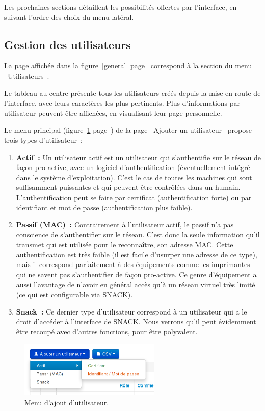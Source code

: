 Les prochaines sections détaillent les possibilités offertes par l'interface, en suivant l'ordre des choix du menu latéral.

\subsection{Gestion des utilisateurs}

La page affichée dans la figure~\ref{general} page~\pageref{general} correspond à la section du menu \og~Utilisateurs~\fg.

Le tableau au centre présente tous les utilisateurs créés depuis la mise en route de l'interface, avec leurs caractères les plus pertinents. Plus d'informations par utilisateur peuvent être affichées, en visualisant leur page personnelle.

Le menu principal (figure~\ref{menuusers} page~\pageref{menuusers}) de la page \og~Ajouter un utilisateur~\fg{} propose trois types d'utilisateur~:

\begin{enumerate}
\item \textbf{Actif~:} Un utilisateur actif est un utilisateur qui s'authentifie sur le réseau de façon pro-active, avec un logiciel d'authentification (éventuellement intégré dans le système d'exploitation). C'est le cas de toutes les machines qui sont suffisamment puissantes et qui peuvent être contrôlées dans un humain. L'authentification peut se faire par certificat (authentification forte) ou par identifiant et mot de passe (authentification plus faible).
\item \textbf{Passif (MAC)~:} Contrairement à l'utilisateur actif, le passif n'a pas conscience de s'authentifier sur le réseau. C'est donc la seule information qu'il transmet qui est utilisée pour le reconnaître, son adresse MAC. Cette authentification est très faible (il est facile d'usurper une adresse de ce type), mais il correspond parfaitement à des équipements comme les imprimantes qui ne savent pas s'authentifier de façon pro-active. Ce genre d'équipement a aussi l'avantage de n'avoir en général accès qu'à un réseau virtuel très limité (ce qui est configurable via SNACK).
\item \textbf{Snack~:} Ce dernier type d'utilisateur correspond à un utilisateur qui a le droit d'accéder à l'interface de SNACK. Nous verrons qu'il peut évidemment être recoupé avec d'autres fonctions, pour être polyvalent.
\end{enumerate}

\begin{figure}[!h]
	\begin{center}
	    \includegraphics[width=0.6\textwidth]{img/menuusers.png}
	\end{center}
	\caption{Menu d'ajout d'utilisateur.}
	\label{menuusers}
\end{figure}


